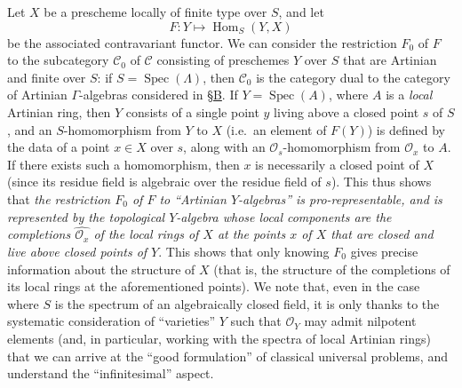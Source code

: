 \documentclass{article}
\newcommand{\oldpage}[1]{\marginpar{\footnotesize$\Big\vert$ \textit{p.~#1}}}
\theoremstyle{definition}
\theoremstyle{definition}
\theoremstyle{definition}
\theoremstyle{definition}
\theoremstyle{remark}
\begin{document}
Let \(X\) be a prescheme locally of finite type over \(S\), and let
\[
  F\colon Y \mapsto \operatorname{Hom}_S(Y,X)
\]
be the associated contravariant functor.
We can consider the restriction \(F_0\) of \(F\) to the subcategory \({\mathcal{C}}_0\) of \({\mathcal{C}}\) consisting of preschemes \(Y\) over \(S\) that are Artinian and finite over \(S\):
if \(S=\operatorname{Spec}(\Lambda)\), then \({\mathcal{C}}_0\) is the category dual to the category of Artinian \(\Gamma\)-algebras considered in \protect\hyperlink{fga-3-ii-section-B}{§B}.
If \(Y=\operatorname{Spec}(A)\), where \(A\) is a \emph{local} Artinian ring, then \(Y\) consists of a single point \(y\) living above a closed point \(s\) of \(S\), and an \(S\)-homomorphism from \(Y\) to \(X\) (i.e.~an element of \(F(Y)\)) is defined by the data of a point \(x\in X\) over \(s\), along with an \({\mathscr{O}}_s\)-homomorphism from \({\mathscr{O}}_x\) to \(A\).
If there exists such a homomorphism, then \(x\) is necessarily a closed point of \(X\) (since its residue field is algebraic over the residue field of \(s\)).
This thus shows that \emph{the restriction \(F_0\) of \(F\) to ``Artinian \(Y\)-algebras'' is pro-representable, and is represented by the topological \(Y\)-algebra whose local components are the completions \(\widehat{{\mathscr{O}}_x}\) of the local rings of \(X\) at the points \(x\) of \(X\) that are closed and live above closed points of \(Y\)}.
This shows that only knowing \(F_0\) gives precise information about the structure of \(X\) (that is, the structure of the completions of its local rings at the aforementioned points).
\oldpage{195-12}We note that, even in the case where \(S\) is the spectrum of an algebraically closed field, it is only thanks to the systematic consideration of ``varieties'' \(Y\) such that \({\mathscr{O}}_Y\) may admit nilpotent elements (and, in particular, working with the spectra of local Artinian rings) that we can arrive at the ``good formulation'' of classical universal problems, and understand the ``infinitesimal'' aspect.
\end{document}
